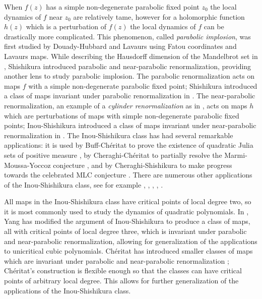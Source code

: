 \documentclass[12pt,letterpaper]{amsart}
\numberwithin{equation}{section}
\theoremstyle{remark}
\theoremstyle{definition}
\begin{document}
	When $f(z)$ has a simple non-degenerate parabolic fixed point $z_0$ the local dynamics of $f$ near $z_0$ are relatively tame, however for a holomorphic function $h(z)$ which is a perturbation of $f(z)$ the local dynamics of $f$ can be drastically more complicated. This phenomenon, called \textit{parabolic implosion}, was first studied by  Douady-Hubbard \cite{Orsay1,Orsay2} and Lavaurs \cite{Lavaurs} using Fatou coordinates and Lavaurs maps. While describing the Hausdorff dimension of the Mandelbrot set in \cite{shishikura_boundary}, Shishikura introduced parabolic and near-parabolic renormalization, providing another lens to study parabolic implosion. The parabolic renormalization acts on maps $f$ with a simple non-degenerate parabolic fixed point; Shishikura introduced a class of maps invariant under parabolic renormalization in \cite{shishikura_1}. The near-parabolic renormalization, an example of a \textit{cylinder renormalization} as in \cite{yampolsky}, acts on maps $h$ which are perturbations of maps with simple non-degenerate parabolic fixed points; Inou-Shishikura introduced a class of maps invariant under near-parabolic renormalization in \cite{shishikura}. The Inou-Shishikura class has had several remarkable applications:
	 it is used by Buff-Ch\'eritat to prove the existence of quadratic Julia sets of positive measure \cite{positive_area}, by Cheraghi-Ch\'eritat to partially resolve the Marmi-Moussa-Yoccoz conjecture \cite{MMYconjecture}, and by Cheraghi-Shishikura to make progress towards the celebrated MLC conjecture \cite{CS_satellite}.
	There are numerous other applications of the Inou-Shishikura class, see for example \cite{AC18}, \cite{Cheraghi13}, \cite{Cheraghi17}, \cite{Cheraghi19},  \cite{Shishkura-Yang}. 
	
	All maps in the Inou-Shishikura class have critical points of local degree two, so it is most commonly used to study the dynamics of quadratic polynomials. 
	In \cite{Yang}, Yang has modified the argument of Inou-Shishikura to produce a class of maps, all with critical points of local degree three, which is invariant under parabolic and near-parabolic renormalization, allowing for generalization of the applications to unicritical cubic polynomials.
	Ch\'eritat has introduced smaller classes of maps which are invariant under parabolic and near-parabolic renormalization \cite{Cheritat22}; Ch\'eritat's construction is flexible enough so that the classes can have critical points of arbitrary local degree. This allows for further generalization of the applications of the Inou-Shishikura class. 
	
\end{document}
